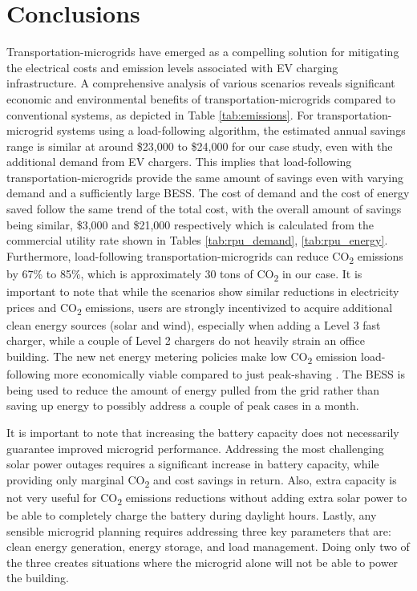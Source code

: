 \documentclass[conference]{IEEEtran}
\begin{document}
	\section{Conclusions}
	Transportation-microgrids have emerged as a compelling solution for mitigating the electrical costs and emission levels associated with EV charging infrastructure. A comprehensive analysis of various scenarios reveals significant economic and environmental benefits of transportation-microgrids compared to conventional systems, as depicted in  Table \ref{tab:emissions}. For transportation-microgrid systems using a load-following algorithm, the estimated annual savings range is similar at around \$23,000 to \$24,000 for our case study, even with the additional demand from EV chargers. This implies that load-following transportation-microgrids provide the same amount of savings even with varying demand and a sufficiently large BESS. The cost of demand and the cost of energy saved follow the same trend of the total cost, with the overall amount of savings being similar, \$3,000 and \$21,000 respectively which is calculated from the commercial utility rate shown in Tables \ref{tab:rpu_demand}, \ref{tab:rpu_energy}. Furthermore, load-following transportation-microgrids can reduce CO\textsubscript{2} emissions by 67\% to 85\%, which is approximately 30 tons of CO\textsubscript{2} in our case. It is important to note that while the scenarios show similar reductions in electricity prices and CO\textsubscript{2} emissions, users are strongly incentivized to acquire additional clean energy sources (solar and wind), especially when adding a Level 3 fast charger, while a couple of Level 2 chargers do not heavily strain an office building. The new net energy metering policies make low CO\textsubscript{2} emission load-following more economically viable compared to just peak-shaving \cite{rpu_nem}. The BESS is being used to reduce the amount of energy pulled from the grid rather than saving up energy to possibly address a couple of peak cases in a month.
	
	It is important to note that increasing the battery capacity does not necessarily guarantee improved microgrid performance. Addressing the most challenging solar power outages requires a significant increase in battery capacity, while providing only marginal CO\textsubscript{2} and cost savings in return. Also, extra capacity is not very useful for CO\textsubscript{2} emissions reductions without adding extra solar power to be able to completely charge the battery during daylight hours. Lastly, any sensible microgrid planning requires addressing three key parameters that are: clean energy generation, energy storage, and load management. Doing only two of the three creates situations where the microgrid alone will not be able to power the building.
	
\end{document}
